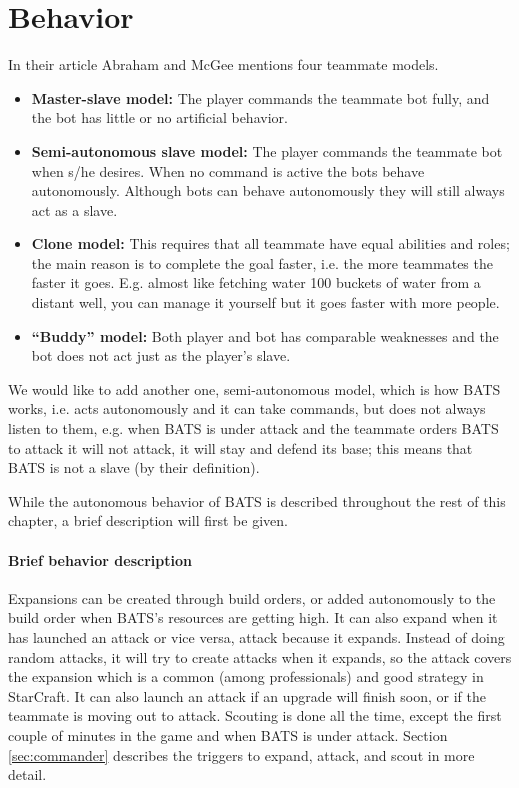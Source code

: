 \section{Behavior}
In their article\cite{abraham10} Abraham and McGee mentions four teammate models.
\begin{itemize}
	\item \textbf{Master-slave model:} The player commands the teammate bot fully, and the bot has little or no artificial behavior.
	\item \textbf{Semi-autonomous slave model:} The player commands the teammate bot when s/he desires. When no command is active the bots behave autonomously. Although bots can behave autonomously they will still always act as a slave.
	\item \textbf{Clone model:} This requires that all teammate have equal abilities and roles; the main reason is to complete the goal faster, i.e. the more teammates the faster it goes. E.g. almost like fetching water 100 buckets of water from a distant well, you can manage it yourself but it goes faster with more people.
	\item \textbf{“Buddy” model:} Both player and bot has comparable weaknesses and the bot does not act just as the player’s slave.
\end{itemize}
We would like to add another one, semi-autonomous model, which is how BATS works, i.e. acts autonomously and it can take commands, but does not always listen to them, e.g. when BATS is under attack and the teammate orders BATS to attack it will not attack, it will stay and defend its base; this means that BATS is not a slave (by their definition).

While the autonomous behavior of BATS is described throughout the rest of this chapter, a brief description will first be given.

\paragraph{Brief behavior description}
Expansions can be created through build orders, or added autonomously to the build order when BATS's resources are getting high. It can also expand when it has launched an attack or vice versa, attack because it expands. Instead of doing random attacks, it will try to create attacks when it expands, so the attack covers the expansion which is a common (among professionals) and good strategy in StarCraft\cite{day9}. It can also launch an attack if an upgrade will finish soon, or if the teammate is moving out to attack. Scouting is done all the time, except the first couple of minutes in the game and when BATS is under attack. Section \ref{sec:commander}  describes the triggers to expand, attack, and scout in more detail.

